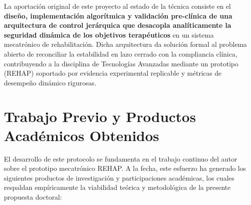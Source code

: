 \documentclass[a4paper,12pt]{article}
\begin{document}
La aportación original de este proyecto al estado de la técnica consiste en el \textbf{diseño, implementación algorítmica y validación pre-clínica de una arquitectura de control jerárquica que desacopla analíticamente la seguridad dinámica de los objetivos terapéuticos} en un sistema mecatrónico de rehabilitación. Dicha arquitectura da solución formal al problema abierto de reconciliar la estabilidad en lazo cerrado con la compliancia clínica, contribuyendo a la disciplina de Tecnologías Avanzadas mediante un prototipo (REHAP) soportado por evidencia experimental replicable y métricas de desempeño dinámico rigurosas.

\newpage
\section{Trabajo Previo y Productos Académicos Obtenidos}

El desarrollo de este protocolo se fundamenta en el trabajo continuo del autor sobre el prototipo mecatrónico REHAP. A la fecha, este esfuerzo ha generado los siguientes productos de investigación y participaciones académicas, los cuales respaldan empíricamente la viabilidad teórica y metodológica de la presente propuesta doctoral:
\end{document}
